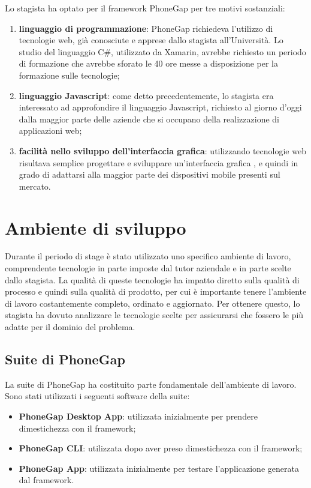 Lo stagista ha optato per il framework PhoneGap per tre motivi sostanziali:
\begin{enumerate}
	\item \textbf{linguaggio di programmazione}: PhoneGap richiedeva l'utilizzo di tecnologie web, già conosciute e apprese dallo stagista all'Università. Lo studio del linguaggio C\#, utilizzato da Xamarin, avrebbe richiesto un periodo di formazione che avrebbe sforato le 40 ore messe a disposizione per la formazione sulle tecnologie;
	\item \textbf{linguaggio Javascript}: come detto precedentemente, lo stagista era interessato ad approfondire il linguaggio Javascript, richiesto al giorno d'oggi dalla maggior parte delle aziende che si occupano della realizzazione di applicazioni web;
	\item \textbf{facilità nello sviluppo dell'interfaccia grafica}: utilizzando tecnologie web risultava semplice progettare e sviluppare un'interfaccia grafica , e quindi in grado di adattarsi alla maggior parte dei dispositivi mobile presenti sul mercato.
\end{enumerate}

\section{Ambiente di sviluppo}

Durante il periodo di stage è stato utilizzato uno specifico ambiente di lavoro, comprendente tecnologie in parte imposte dal tutor aziendale e in parte scelte dallo stagista. La qualità di queste tecnologie ha impatto diretto sulla qualità di processo e quindi sulla qualità di prodotto, per cui è importante tenere l'ambiente di lavoro costantemente completo, ordinato e aggiornato. Per ottenere questo, lo stagista ha dovuto analizzare le tecnologie scelte per assicurarsi che fossero le più adatte per il dominio del problema.

\subsection{Suite di PhoneGap}

La suite di PhoneGap ha costituito parte fondamentale dell'ambiente di lavoro. Sono stati utilizzati i seguenti software della suite:
\begin{itemize}
	\item \textbf{PhoneGap Desktop App}: utilizzata inizialmente per prendere dimestichezza con il framework;
	\item \textbf{PhoneGap CLI}: utilizzata dopo aver preso dimestichezza con il framework;
	\item \textbf{PhoneGap App}: utilizzata inizialmente per testare l'applicazione generata dal framework.
\end{itemize}

